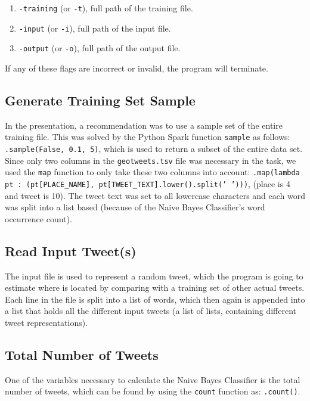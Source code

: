 \documentclass{article}
\begin{document}
\begin{enumerate}
    \item \texttt{-training} (or \texttt{-t}), full path of the training file.
    \item \texttt{-input} (or \texttt{-i}), full path of the input file.
    \item \texttt{-output} (or \texttt{-o}), full path of the output file.
\end{enumerate}

\noindent If any of these flags are incorrect or invalid, the program will terminate.


\subsection*{Generate Training Set Sample}
In the presentation, a recommendation was to use a sample set of the entire training file. This was solved by the Python Spark function \texttt{sample} as follows: \texttt{.sample(False, 0.1, 5)}, which is used to return a subset of the entire data set.\\

\noindent Since only two columns in the \texttt{geotweets.tsv} file was necessary in the task, we used the \texttt{map} function to only take these two columns into account: \texttt{.map(lambda pt : (pt[PLACE\_NAME], pt[TWEET\_TEXT].lower().split(' ')))}, (place is 4 and tweet is 10). The tweet text was set to all lowercase characters and each word was split into a list based (because of the Naive Bayes Classifier's word occurrence count).


\subsection*{Read Input Tweet(s)}
The input file is used to represent a random tweet, which the program is going to estimate where is located by comparing with a training set of other actual tweets. Each line in the file is split into a list of words, which then again is appended into a list that holds all the different input tweets (a list of lists, containing different tweet representations).


\subsection*{Total Number of Tweets}
One of the variables necessary to calculate the Naive Bayes Classifier is the total number of tweets, which can be found by using the \texttt{count} function as: \texttt{.count()}.
\end{document}
